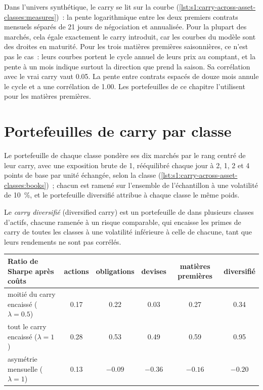 Dans l'univers synthétique, le carry se lit sur la courbe (\cref{lst:s1:carry-across-asset-classes:measures})~: la pente logarithmique entre les deux premiers
contrats mensuels séparés de 21 jours de négociation et annualisée. Pour la plupart des marchés, cela égale exactement le carry introduit, car les courbes du modèle sont des droites en
maturité. Pour les trois matières premières saisonnières, ce n'est pas le cas~: leurs courbes portent le cycle annuel de leurs prix au comptant, et la pente à un mois indique surtout
la direction que prend la saison. Sa corrélation avec le vrai carry vaut 0.05. La pente entre contrats espacés de douze mois annule le cycle et
a une corrélation de 1.00. Les portefeuilles de ce chapitre l'utilisent pour les matières premières.

\section{Portefeuilles de carry par classe}

Le portefeuille de chaque classe pondère ses dix marchés par le rang centré de leur carry, avec une exposition brute de 1, rééquilibré chaque jour à 2, 1, 2 et 4 points
de base par unité échangée, selon la classe (\cref{lst:s1:carry-across-asset-classes:books})~; chacun est ramené sur l'ensemble de l'échantillon à une volatilité de 10~\%, et le
portefeuille diversifié attribue à chaque classe le même poids.

\begin{definition}\label{def:s1:carry-across-asset-classes:diversified}
Le \emph{carry diversifié} (diversified carry) est un portefeuille de  dans plusieurs classes d'actifs, chacune ramenée à un risque comparable, qui
encaisse les primes de carry de toutes les classes à une volatilité inférieure à celle de chacune, tant que leurs rendements ne sont pas corrélés.
\end{definition}

\begin{center}
\small
\begin{tabular}{@{}lccccc@{}}
\toprule
Ratio de Sharpe après coûts & actions & obligations & devises & matières premières & diversifié\\
\midrule
moitié du carry encaissé ($\lambda = 0.5$) & 0.17 & 0.22 & 0.03 & 0.27 & 0.34\\
tout le carry encaissé ($\lambda = 1$) & 0.28 & 0.53 & 0.49 & 0.59 & 0.95\\
\midrule
asymétrie mensuelle ($\lambda = 1$) & 0.13 & $-0.09$ & $-0.36$ & $-0.16$ & $-0.20$\\
\bottomrule
\end{tabular}
\end{center}

